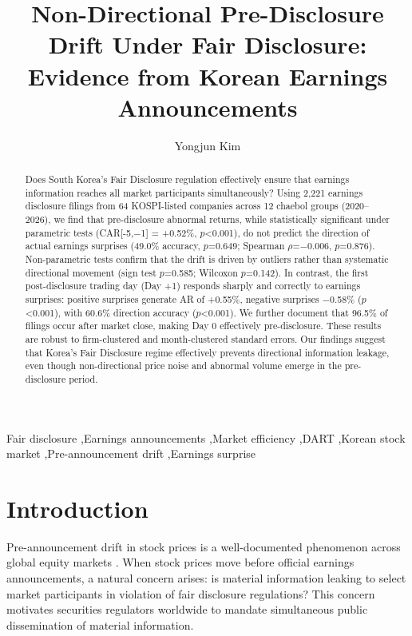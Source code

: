 \documentclass[review,authoryear]{elsarticle}
\begin{document}
\begin{frontmatter}

\title{Non-Directional Pre-Disclosure Drift Under Fair Disclosure: Evidence from Korean Earnings Announcements}

\author{Yongjun Kim}

\begin{abstract}
Does South Korea's Fair Disclosure regulation effectively ensure that earnings information reaches all market participants simultaneously? Using 2,221 earnings disclosure filings from 64 KOSPI-listed companies across 12 chaebol groups (2020--2026), we find that pre-disclosure abnormal returns, while statistically significant under parametric tests (CAR[-5,$-$1] = +0.52\%, $p$<0.001), do not predict the direction of actual earnings surprises (49.0\% accuracy, $p$=0.649; Spearman $\rho$=$-$0.006, $p$=0.876). Non-parametric tests confirm that the drift is driven by outliers rather than systematic directional movement (sign test $p$=0.585; Wilcoxon $p$=0.142). In contrast, the first post-disclosure trading day (Day +1) responds sharply and correctly to earnings surprises: positive surprises generate AR of +0.55\%, negative surprises $-$0.58\% ($p$<0.001), with 60.6\% direction accuracy ($p$<0.001). We further document that 96.5\% of filings occur after market close, making Day 0 effectively pre-disclosure. These results are robust to firm-clustered and month-clustered standard errors. Our findings suggest that Korea's Fair Disclosure regime effectively prevents directional information leakage, even though non-directional price noise and abnormal volume emerge in the pre-disclosure period.
\end{abstract}

\begin{keyword}
Fair disclosure \sep Earnings announcements \sep Market efficiency \sep DART \sep Korean stock market \sep Pre-announcement drift \sep Earnings surprise
\end{keyword}

\end{frontmatter}

\section{Introduction}

Pre-announcement drift in stock prices is a well-documented phenomenon across global equity markets \citep{kaniel2012individual}. When stock prices move before official earnings announcements, a natural concern arises: is material information leaking to select market participants in violation of fair disclosure regulations? This concern motivates securities regulators worldwide to mandate simultaneous public dissemination of material information.
\end{document}
